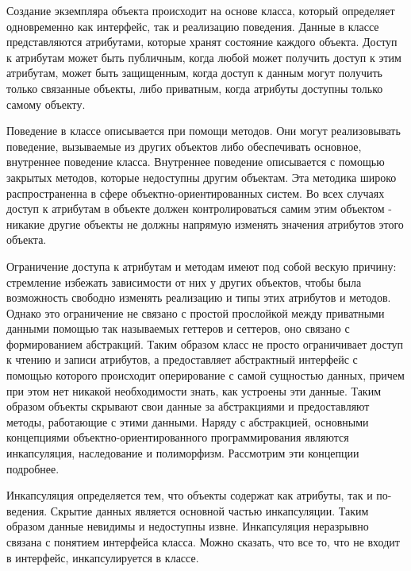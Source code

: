 \documentclass[russian,utf8,simple,hpadding=10mm,vpadding=20mm]{eskdtext}
\begin{document}
Создание экземпляра объекта происходит на основе класса, который определяет одновременно как интерфейс, так и реализацию поведения. Данные в классе представляются атрибутами, которые хранят состояние каждого объекта. Доступ к атрибутам может быть публичным, когда любой может получить доступ к этим атрибутам, может быть защищенным, когда доступ к данным могут получить только связанные объекты, либо приватным, когда атрибуты доступны только самому объекту.

Поведение в классе описывается при помощи методов. Они могут реализовывать поведение, вызываемые из других объектов либо обеспечивать основное, внутреннее поведение класса. Внутреннее поведение описывается с помощью закрытых методов, которые недоступны другим объектам.  Эта методика широко распространенна в сфере объектно-ориентированных систем. Во всех случаях доступ к атрибутам в объекте должен контролироваться самим этим объектом - никакие другие объекты не должны напрямую изменять значения атрибутов этого объекта.

Ограничение доступа к атрибутам и методам имеют под собой вескую причину: стремление избежать зависимости от них у других объектов, чтобы была возможность свободно изменять реализацию и типы этих атрибутов и методов.  Однако это ограничение не связано с простой прослойкой  между приватными данными  помощью так называемых геттеров и сеттеров, оно связано с формированием абстракций. Таким образом класс не просто ограничивает доступ к чтению и записи атрибутов,  а предоставляет  абстрактный интерфейс с помощью которого происходит оперирование с самой сущностью данных, причем при этом нет никакой необходимости знать, как устроены эти данные. Таким образом объекты скрывают свои данные за абстракциями и предоставляют методы, работающие с этими данными. Наряду с абстракцией, основными концепциями объектно-ориентированного программирования являются инкапсуляция, наследование и полиморфизм. Рассмотрим эти концепции подробнее.

Инкапсуляция определяется тем, что объекты содержат как атрибуты, так и по-
ведения. Скрытие данных является основной частью инкапсуляции. Таким образом
данные невидимы и недоступны извне.  Инкапсуляция неразрывно связана с понятием интерфейса класса. Можно сказать, что все то, что не входит в интерфейс, инкапсулируется в классе.
\end{document}
